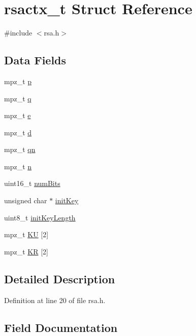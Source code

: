 \hypertarget{structrsactx__t}{}\section{rsactx\+\_\+t Struct Reference}
\label{structrsactx__t}


{\ttfamily \#include $<$rsa.\+h$>$}

\subsection*{Data Fields}
\begin{DoxyCompactItemize}
\item 
mpz\+\_\+t \hyperlink{structrsactx__t_a0e4c86a571e946d9d6a5160989713989}{p}
\item 
mpz\+\_\+t \hyperlink{structrsactx__t_aba94275944de73c899dbeb5f987c82cd}{q}
\item 
mpz\+\_\+t \hyperlink{structrsactx__t_a61aae5341c97210088a1480fa6bc2db4}{e}
\item 
mpz\+\_\+t \hyperlink{structrsactx__t_a4e9841cad572137fe14a4d6462c4469a}{d}
\item 
mpz\+\_\+t \hyperlink{structrsactx__t_ac9a71ce903d1d02bd0850eb017922d80}{qn}
\item 
mpz\+\_\+t \hyperlink{structrsactx__t_a6202bb3ec0e257e04ba4ac9e9f6b92b0}{n}
\item 
uint16\+\_\+t \hyperlink{structrsactx__t_a07f83468c3d651766dd2a28e354ee294}{num\+Bits}
\item 
unsigned char $\ast$ \hyperlink{structrsactx__t_a41c5b03ddf5c454d46f17e889ad5182a}{init\+Key}
\item 
uint8\+\_\+t \hyperlink{structrsactx__t_abf718bf2d3f32965c978cc96c1b746c2}{init\+Key\+Length}
\item 
mpz\+\_\+t \hyperlink{structrsactx__t_a669520018df4fe14d2e2682ed3fb62fb}{KU} \mbox{[}2\mbox{]}
\item 
mpz\+\_\+t \hyperlink{structrsactx__t_ab10507120c561dcb2660e5600557be47}{KR} \mbox{[}2\mbox{]}
\end{DoxyCompactItemize}


\subsection{Detailed Description}


Definition at line 20 of file rsa.\+h.



\subsection{Field Documentation}
\mbox{\label{structrsactx__t_a4e9841cad572137fe14a4d6462c4469a}} 
